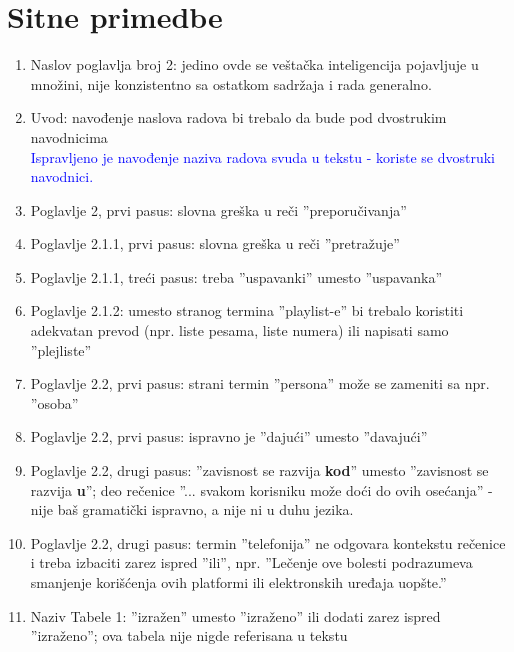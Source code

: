 \documentclass[a4paper]{report}
\newcommand{\odgovor}[1]{\textcolor{blue}{#1}}
\begin{document}
\section{Sitne primedbe}
\begin{enumerate}
\item Naslov poglavlja broj 2: jedino ovde se veštačka inteligencija pojavljuje u množini, nije konzistentno sa ostatkom sadržaja i rada generalno.

\item Uvod: navođenje naslova radova bi trebalo da bude pod dvostrukim navodnicima \\
\odgovor{Ispravljeno je navođenje naziva radova svuda u tekstu - koriste se dvostruki navodnici.}

\item Poglavlje 2, prvi pasus: slovna greška u reči ''preporučivanja''

\item Poglavlje 2.1.1, prvi pasus: slovna greška u reči ''pretražuje''

\item Poglavlje 2.1.1, treći pasus: treba ''uspavanki'' umesto ''uspavanka''

\item Poglavlje 2.1.2: umesto stranog termina ''playlist-e'' bi trebalo koristiti adekvatan prevod (npr. liste pesama, liste numera) ili napisati samo ''plejliste''

\item Poglavlje 2.2, prvi pasus: strani termin ''persona'' može se zameniti sa npr. ''osoba'' 

\item Poglavlje 2.2, prvi pasus: ispravno je ''dajući'' umesto ''davajući''

\item Poglavlje 2.2, drugi pasus: ''zavisnost se razvija \textbf{kod}'' umesto ''zavisnost se razvija \textbf{u}''; deo rečenice ''... svakom korisniku može doći do ovih osećanja'' - nije baš gramatički ispravno, a nije ni u duhu jezika.

\item Poglavlje 2.2, drugi pasus: termin ''telefonija'' ne odgovara kontekstu rečenice i treba izbaciti zarez ispred ''ili'', npr. ''Lečenje ove bolesti podrazumeva smanjenje
korišćenja ovih platformi ili elektronskih uređaja uopšte.''

\item Naziv Tabele 1: ''izražen'' umesto ''izraženo'' ili dodati zarez ispred ''izraženo''; ova tabela nije nigde referisana u tekstu


\end{enumerate}
\end{document}
